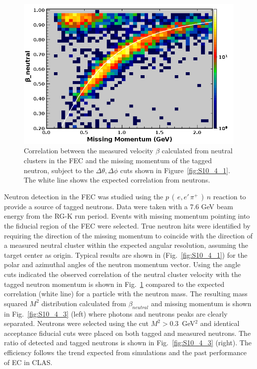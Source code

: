 \begin{figure}[h]
\centering
\includegraphics[width=1.0\columnwidth,keepaspectratio]{img/S10_4_2.png}
\caption[]{Correlation between the measured velocity $\beta$ calculated from neutral clusters in the FEC and the missing momentum of the tagged neutron, subject to the $\Delta\theta,\Delta\phi$ cuts shown in Figure~\ref{fig:S10_4_1}.  The white line shows the expected correlation from neutrons.}
\label{fig:S10_4_2}
\end{figure}

Neutron detection in the FEC was studied using the $p\,(\,e,e'\,\pi^+\,)\,n$ reaction to provide a source of tagged neutrons. Data were taken with a 7.6 GeV beam energy from the RG-K run period.  Events with missing momentum pointing into the fiducial region of the FEC were selected.  True neutron hits were identified by requiring the direction of the missing momentum to coincide with the direction of a measured neutral cluster within the expected angular resolution, assuming the target center as origin.  Typical results are shown in (Fig.~\ref{fig:S10_4_1}) for the polar and azimuthal angles of the neutron momentum vector.  Using the angle cuts indicated the observed correlation of the neutral cluster velocity with the tagged neutron momentum is shown in Fig.~\ref{fig:S10_4_2} compared to the expected correlation (white line) for a particle with the neutron mass.  The resulting mass squared $M^2$ distribution calculated from $\beta_{neutral}$ and missing momentum is shown in Fig.~\ref{fig:S10_4_3} (left) where photons and neutrons peaks are clearly separated.  Neutrons were selected using the cut $M^2 > 0.3$~GeV$^2$ and identical acceptance fiducial cuts were placed on both tagged and measured neutrons.  The ratio of detected and tagged neutrons is shown in Fig.~\ref{fig:S10_4_3} (right).  The efficiency follows the trend expected from simulations and the past performance of EC in CLAS.     

